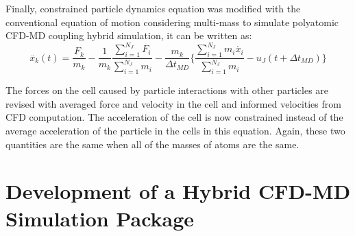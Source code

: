 \documentclass[]{aiaa-tc}%
\begin{document}
Finally, constrained particle dynamics equation was modified with the conventional equation of motion considering multi-mass to simulate polyatomic CFD-MD coupling hybrid simulation, it can be written as:
\vspace{-.2em}
\begin{equation}
 \ddot{x_{k}}(t) = \frac{F_{k}}{m_{k}} -  \frac{1}{m_k} \frac{\displaystyle\sum_{i=1}^{N_J}F_{i}} {\displaystyle\sum_{i=1}^{N_J}m_{i}} - \frac{m_k}{\Delta t_{MD}} \{  \frac{\displaystyle\sum_{i=1}^{N_J}m_{i}\dot{x_{i}}} {\displaystyle\sum_{i=1}^{N_J}m_{i}} - u_{J}(t + \Delta t_{MD})\}
 \label{eq:EOM}
\end{equation}
\normalsize

The forces on the cell caused by particle interactions with other particles are revised with averaged force and velocity in the cell and informed velocities from CFD computation. The acceleration of the cell is now constrained instead of the average acceleration of the particle in the cells in this equation.  Again, these two quantities are the same when all of the masses of atoms are the same. 













\section{Development of a Hybrid CFD-MD Simulation Package}
\label{sec:numerics}
\end{document}

